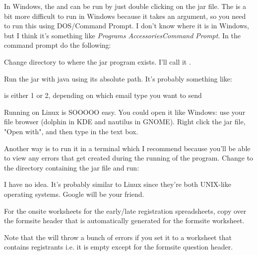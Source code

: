 \documentclass[12pt,final]{article}
\begin{document}

In Windows, the  and
 can be run by just double clicking on the jar file.
The  is a bit more difficult to run in Windows because it
takes an argument, so you need to run this using DOS/Command Prompt. I don't
know where it is in Windows, but I think it's something like \emph{Programs\ra
Accessories\ra Command Prompt}. In the command prompt do the following:
\benum
	\item Change directory to where the  jar program exists.
		I'll call it .
	\item Run the jar with java using its absolute path. It's probably something like:
	\item {} is either 1 or 2, depending on which email type you want to send
\eenum


Running on Linux is SOOOOO easy. You could open it like Windows: use your file
browser (dolphin in KDE and nautilus in GNOME). Right click the jar file, "Open
with", and then type  in the text box. 

Another way is to run it in a terminal which I recommend because you'll be able
to view any errors that get created during the running of the program. Change
to the directory containing the jar file and run:
\bitem
\eitem


I have no idea. It's probably similar to Linux since they're both UNIX-like
operating systems. Google will be your friend.


For the onsite worksheets for the early/late registration spreadsheets, copy
over the formsite header that is automatically generated for the formsite
worksheet.

Note that the  will throw a bunch of errors if you set
it to a worksheet that contains  registrants i.e. it is empty except for
the formsite question header.
\end{document}
